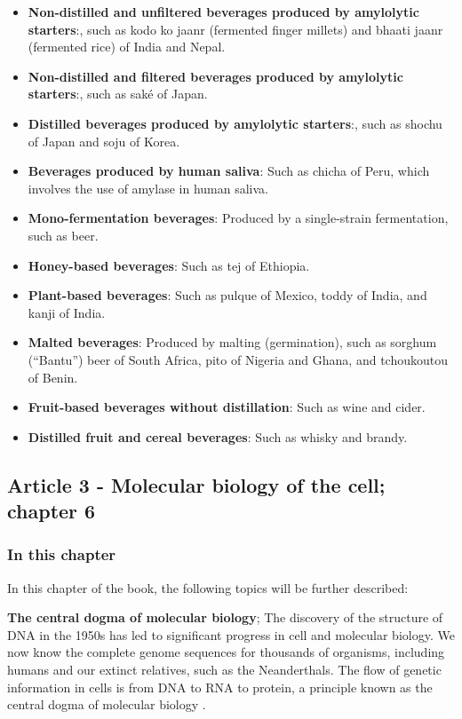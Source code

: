 \begin{itemize}
    \item \textbf{Non-distilled and unfiltered beverages produced by amylolytic starters}:, such as kodo ko jaanr (fermented finger millets) and bhaati jaanr (fermented rice) of India and Nepal.
    \item \textbf{Non-distilled and filtered beverages produced by amylolytic starters}:, such as saké of Japan.
    \item \textbf{Distilled beverages produced by amylolytic starters}:, such as shochu of Japan and soju of Korea.
    \item \textbf{Beverages produced by human saliva}: Such as chicha of Peru, which involves the use of amylase in human saliva.
    \item \textbf{Mono-fermentation beverages}: Produced by a single-strain fermentation, such as beer.
    \item \textbf{Honey-based beverages}: Such as tej of Ethiopia.
    \item \textbf{Plant-based beverages}: Such as pulque of Mexico, toddy of India, and kanji of India.
    \item \textbf{Malted beverages}: Produced by malting (germination), such as sorghum (“Bantu”) beer of South Africa, pito of Nigeria and Ghana, and tchoukoutou of Benin.
    \item \textbf{Fruit-based beverages without distillation}: Such as wine and cider.
    \item \textbf{Distilled fruit and cereal beverages}: Such as whisky and brandy.
\end{itemize}


\subsection{Article 3 - Molecular biology of the cell; chapter 6}

\subsubsection*{In this chapter}
In this chapter of the book, the following topics will be further described:

\textbf{The central dogma of molecular biology};
The discovery of the structure of DNA in the 1950s has led to significant progress in cell and molecular biology. We now know the complete genome sequences for thousands of organisms, including humans and our extinct relatives, such as the Neanderthals. The flow of genetic information in cells is from DNA to RNA to protein, a principle known as the central dogma of molecular biology \cite*{L1-Chapter6}.

